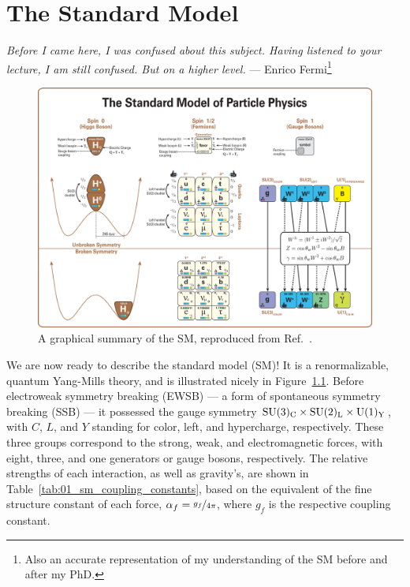 \chapter{The Standard Model}
\label{sec:01_sm}

\begin{center}
	\centering
	\noindent
	\textit{Before I came here, I was confused about this subject. Having listened to your lecture, I am still confused. But on a higher level.} --- Enrico Fermi\footnote{Also an accurate representation of my understanding of the SM before and after my PhD.}
\end{center}


\begin{figure}
	\centering
	\captionsetup{justification=centering}
	\includegraphics[width=\textwidth]{figures/01-SM-03-SM/Standard_Model_Of_Particle_Physics--Most_Complete_Diagram.png}
	\caption{A graphical summary of the SM, reproduced from Ref.~\cite{SMMostCompleteDiagram}.}
	\label{fig:01_sm_summary}
\end{figure}

We are now ready to describe the standard model (SM)!
It is a renormalizable, quantum Yang-Mills theory, and is illustrated nicely in Figure~\ref{fig:01_sm_summary}.
Before electroweak symmetry breaking (EWSB) --- a form of spontaneous symmetry breaking (SSB) --- it possessed the gauge symmetry $\SU[3]_{\mathrm{C}} \times \SU[2]_{\mathrm{L}} \times \UU[1]_{\mathrm{Y}}$, with $C$, $L$, and $Y$ standing for color, left, and hypercharge, respectively.
These three groups correspond to the strong, weak, and electromagnetic forces, with eight, three, and one generators or gauge bosons, respectively.
The relative strengths of each interaction, as well as gravity's, are shown in Table~\ref{tab:01_sm_coupling_constants}, based on the equivalent of the fine structure constant of each force, $\alpha_f = \cnicefrac{g_f}{4\pi}$, where $g_f$ is the respective coupling constant.

